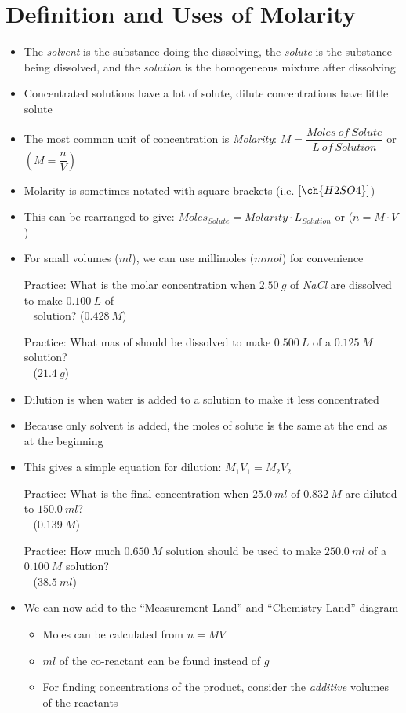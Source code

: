 \documentclass[12pt, openany, letterpaper]{memoir}
\begin{document}
\section{Definition and Uses of Molarity}
\begin{itemize}
	\item The \emph{solvent} is the substance doing the dissolving, the \emph{solute} is the substance being dissolved, and the \emph{solution} is the homogeneous mixture after dissolving
	\item Concentrated solutions have a lot of solute, dilute concentrations have little solute
	\item The most common unit of concentration is \emph{Molarity}: $M=\dfrac{Moles~of~Solute}{L~of~Solution}$ or $\left(M=\dfrac{n}{V}\right)$
	\item Molarity is sometimes notated with square brackets (i.e. $\left[\ch{H2SO4}\right]$)
	\item This can be rearranged to give: $Moles_{Solute} = Molarity \cdot L_{Solution}$ or ($n = M\cdot V$)
	\item For small volumes ($ml$), we can use millimoles ($mmol$) for convenience

	      Practice: What is the molar concentration when $2.50~g$ of \emph{NaCl} are dissolved to make $0.100~L$ of\\ ~\hphantom{Practice: } solution? \hspace{1em} ($0.428~M$)

	      Practice: What mas of  should be dissolved to make $0.500~L$ of a $0.125~M$ solution?\\
	      ~\hphantom{Practice: } ($21.4~g$)
	\item Dilution is when water is added to a solution to make it less concentrated
	\item Because only solvent is added, the moles of solute is the same at the end as at the beginning
	\item This gives a simple equation for dilution: $M_1V_1=M_2V_2$

	      Practice: What is the final concentration when $25.0~ml$ of $0.832~M$ are diluted to $150.0~ml$?\\
	      ~\hphantom{Practice: } ($0.139~M$)

	      Practice: How much $0.650~M$ solution should be used to make $250.0~ml$ of a $0.100~M$ solution?\\
	      ~\hphantom{Practice: } ($38.5~ml$)
	\item We can now add to the ``Measurement Land'' and ``Chemistry Land'' diagram
	      \begin{itemize}
		      \item Moles can be calculated from $n = MV$
		      \item $ml$ of the co-reactant can be found instead of $g$
		      \item For finding concentrations of the product, consider the \emph{additive} volumes of the reactants
	      \end{itemize}


\end{itemize}
\end{document}

